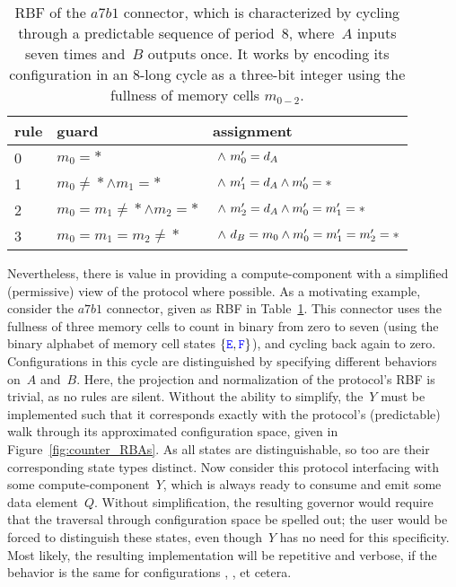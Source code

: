 \begin{table}
	\centering
	\begin{tabular}{l|ll}
		rule & guard & assignment \\
		\hline
		0 & $m_0=*$
		& $\ \wedge{}\ {}m_0'=d_A$\\
		1 & $m_0\neq{}*\wedge{}m_1=*$
		& $\ \wedge{}\ {}m_1'=d_A\wedge{}m_0'=*$\\
		2 & $m_0=m_1\neq{}*\wedge{}m_2=*$
		& $\ \wedge{}\ {}m_2'=d_A\wedge{}m_0'=m_1'=*$\\
		3 & $m_0=m_1=m_2\neq{}*$
		& $\ \wedge{}\ {}d_B=m_0\wedge{}m_0'=m_1'=m_2'=*$\\
		\hline
	\end{tabular}
	\caption{RBF of the $a7b1$ connector, which is characterized by cycling through a predictable sequence of period~8, where~$A$ inputs seven times and~$B$ outputs once. It works by encoding its configuration in an 8-long cycle as a three-bit integer using the fullness of memory cells $m_{0-2}$.}
	\label{tab:counting_rbf}
\end{table}

Nevertheless, there is value in providing a compute-component with a simplified (permissive) view of the protocol where possible. As a motivating example, consider the $a7b1$ connector, given as RBF in Table~\ref{tab:counting_rbf}. This connector uses the fullness of three memory cells to count in binary from zero to seven (using the binary alphabet of memory cell states $\{\text{\textcolor{blue}{\texttt{E}}}, \text{\textcolor{blue}{\texttt{F}}}\}$), and cycling back again to zero. Configurations in this cycle are distinguished by specifying different behaviors on~$A$ and~$B$. Here, the projection and normalization of the protocol's RBF is trivial, as no rules are silent. Without the ability to simplify, the~$Y$ must be implemented such that it corresponds exactly with the protocol's (predictable) walk through its approximated configuration space, given in Figure~\ref{fig:counter_RBAs}. As all states are distinguishable, so too are their corresponding state types distinct. Now consider this protocol interfacing with some compute-component~$Y$, which is always ready to consume and emit some data element~$Q$. Without simplification, the resulting governor would require that the traversal through configuration space be spelled out; the user would be forced to distinguish these states, even though~$Y$ has no need for this specificity. Most likely, the resulting implementation will be repetitive and verbose, if the behavior is the same for configurations , , et cetera.

